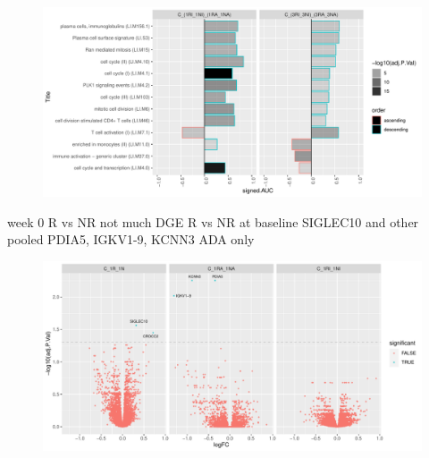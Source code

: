 \begin{outline}
\begin{figure}
    \centering
    \includegraphics[width=1.0\textwidth,page=1]{mainmatter/figures/chapter_04/plot_gene_set_enrichment.tmodCERNO_panelplot_C_(1RI_1NI)_(1RA_1NA),C_(3RI_3NI)_(3RA_3NA).pdf}
    \caption{}
    \label{fig:multipants_dge_tmodCERNO_panelplot_weekxdrug_interaction}
\end{figure}

week 0 R vs NR
    not much DGE R vs NR at baseline
    SIGLEC10 and other pooled 
    PDIA5, IGKV1-9, KCNN3 ADA only


\begin{figure}
    \centering
    \includegraphics[width=1.0\textwidth,page=1]{mainmatter/figures/chapter_04/plot_gene_set_enrichment.volcano_C_1R_1N,C_1RI_1NI,C_1RA_1NA.pdf}
    \caption{}
    \label{fig:multipants_dge_volcano_week_0}
\end{figure}


\end{outline}
